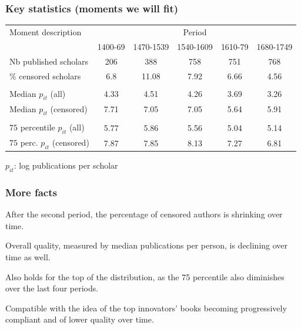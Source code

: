 \documentclass[usepdftitle=false,aspectratio=169,xcolor=dvipsnames]{beamer}
\begin{document}
	\begin{frame}
\frametitle{Key statistics (moments we will fit)}

\begin{tabular}{lccccc}
\hline
\hline
Moment description& \multicolumn{5}{c}{Period}\\
   & 1400-69 &1470-1539 & 1540-1609 & 1610-79 & 1680-1749 \\
\hline
Nb published scholars
    &  206     &  388       &  758      &  751     &  768  \\
\% censored scholars
    &  6.8     &  11.08      &  7.92     &  6.66    &  4.56  \\
    \\
Median $p_{it}$ (all)
    &  4.33     &  4.51      &  4.26     &  3.69    &  3.26  \\
Median $p_{it}$ (censored)
    &  7.71     &  7.05      &  7.05     &  5.64    &  5.91  \\
    \\
$75$ percentile $p_{it}$ (all)
    &  5.77     &  5.86      &  5.56     &  5.04    &  5.14  \\
$75$ perc. $p_{it}$ (censored)
    &  7.87     &  7.85      &  8.13     &  7.27    &  6.81  \\
\hline
\hline
\end{tabular}


$p_{it}$: log publications per scholar

\end{frame}

	\begin{frame}
\frametitle{More facts}

After the second period, the percentage of censored authors is shrinking over time.

 Overall quality, measured by median publications per person, is declining over time as well.

Also holds for the top of the distribution, as the 75 percentile also diminishes over the last four periods.

Compatible with the idea of the top innovators' books becoming progressively compliant and of lower quality over time.


\end{frame}
\end{document}
